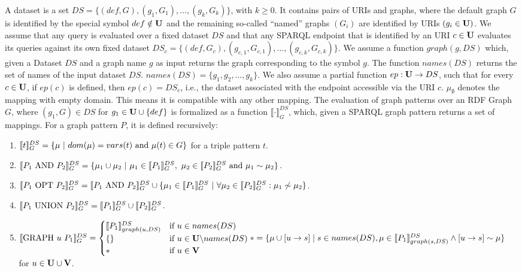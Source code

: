 \begin{definition}
	A dataset is a set $DS = \{(def, G), (g_1,G_1), \dots, (g_k, G_k) \}$, with
	$k\geq 0$. It contains pairs of URIs and graphs,
	where the default graph $G$ is identified by the special symbol $def \notin \mathbf{U}$
	and the remaining so-called ``named'' graphs $(G_i)$ are identified by URIs
	$(g_i \in \mathbf{U})$. We assume that any query is evaluated over a fixed dataset $DS$
	and that any SPARQL endpoint that is identified by an URI $c \in \mathbf{U}$ evaluates
	its queries against its own fixed dataset 
	$DS_c = \{ (def, G_c),(g_{c,1},G_{c,1}), \dots, (g_{c,k},G_{c,k})\}$.
	We assume a function $graph(g,DS)$ which, given a Dataset $DS$ and a graph name $g$ as
	input returns the graph corresponding to the symbol $g$. The function
	$names(DS)$ returns the set of names of the input dataset $DS$.
	$names(DS) = \{g_1,g_2,\dots,g_k\}$.
	We also assume a partial function $ep: \mathbf{U} \rightarrow DS$, such that for every $c \in
	\mathbf{U}$, if $ep(c)$ is defined, then $ep(c) = DS_c$, i.e., the dataset associated with
	the endpoint accessible via the URI $c$.
	$\mu_\emptyset$ denotes the mapping with empty domain. This means it is
	compatible with any other mapping.
	The evaluation of graph patterns over an RDF Graph $G$, where $(g_1,G) \in
	DS$ for $g_1 \in \mathbf{U}\cup\{def\}$ is formalized as a
	function  $\llbracket \cdot \rrbracket_G^{DS}$, which, given a SPARQL graph pattern
	returns a set of mappings.
	For a graph pattern $P$, it is defined recursively:\\
	\begin{enumerate}
		\item $\ll t \rr_G^{DS} = \{ \mu \ | \ dom(\mu) = vars(t) \mbox{ and } \mu(t)
			\in G \}$ for a triple pattern $t$.
		\item $\llbracket P_1 \ \mbox{AND} \ P_2 \rrbracket_G^{DS} = \{ \mu_1 \cup \mu_2  \ | \ \mu_1 \in \llbracket P_1
			\rrbracket_G^{DS},  \ \mu_2 \in \llbracket P_2 \rrbracket_G^{DS} \mbox{ and } \mu_1 \sim \mu_2 \}$.
		\item $\llbracket P_1 \ \mbox{OPT} \ P_2 \rrbracket_G^{DS} = \llbracket P_1 \ \mbox{AND} \ P_2 \rrbracket_G^{DS}
			\cup \{ \mu_1 \in \llbracket P_1
			\rrbracket_G^{DS} \ | \ \forall \mu_2 \in \llbracket P_2 \rrbracket_G^{DS}: \mu_1 \not\sim \mu_2\}$.
		\item $\llbracket P_1 \ \mbox{UNION} \ P_2 \rrbracket_G^{DS} = \llbracket P_1 \rrbracket_G^{DS} \cup \llbracket P_2
			\rrbracket_G^{DS}$.
		\item  $\llbracket \mbox{GRAPH } u \ P_1 \rrbracket_G^{DS}  = 
			\begin{cases} 
				\llbracket P_1\rrbracket_{graph(u,DS)}^{DS} &\mbox{if } u \in names(DS)\\	
				\{ \}						  & \mbox{if } u \in \mathbf{U} \backslash names(DS)\\
				*					  & \mbox{if } u \in \mathbf{V}
				\end{cases}\\
				*=\{\mu \cup [u \rightarrow s] \mid s \in names(DS), \mu
					\in \llbracket P_1 \rrbracket^{DS}_{graph(s,DS)} \land [u \rightarrow s] \sim \mu
				\}	$\\ 
				for $u \in \mathbf{U} \cup \mathbf{V}$.


\end{enumerate}
\end{definition}
